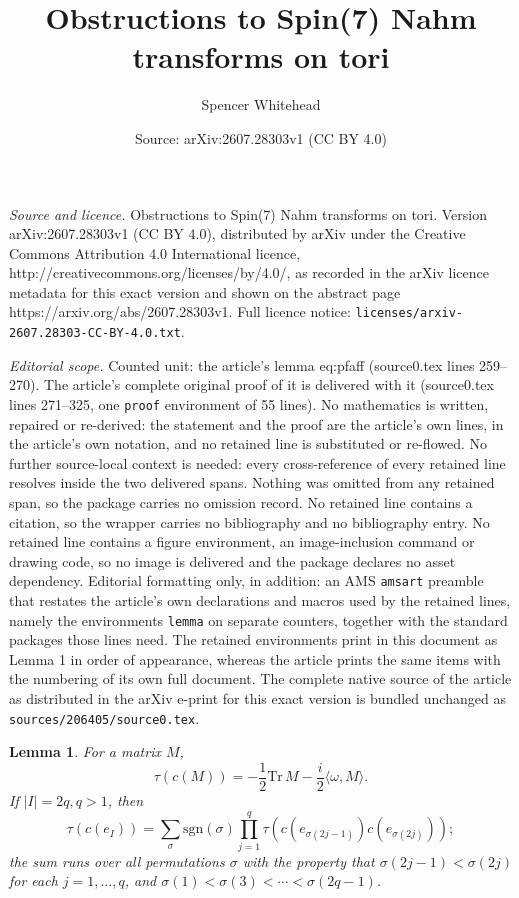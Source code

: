 \documentclass[10pt,a4paper]{amsart}
\title{Obstructions to Spin(7) Nahm transforms on tori}
\author{Spencer Whitehead}
\date{Source: arXiv:2607.28303v1 (CC BY 4.0)}
\newtheorem{lemma}{Lemma}
\begin{document}
\maketitle

\noindent\emph{Source and licence.} Obstructions to Spin(7) Nahm transforms on tori. Version arXiv:2607.28303v1 (CC BY 4.0), distributed by arXiv under the Creative Commons Attribution 4.0 International licence, http://creativecommons.org/licenses/by/4.0/, as recorded in the arXiv licence metadata for this exact version and shown on the abstract page https://arxiv.org/abs/2607.28303v1. Full licence notice: \texttt{licenses/arxiv-2607.28303-CC-BY-4.0.txt}.\par\smallskip

\noindent\textit{Editorial scope.} Counted unit: the article's lemma eq:pfaff (source0.tex lines 259--270). The article's complete original proof of it is delivered with it (source0.tex lines 271--325, one \texttt{proof} environment of 55 lines). No mathematics is written, repaired or re-derived: the statement and the proof are the article's own lines, in the article's own notation, and no retained line is substituted or re-flowed.  No further source-local context is needed: every cross-reference of every retained line resolves inside the two delivered spans.  Nothing was omitted from any retained span, so the package carries no omission record.  No retained line contains a citation, so the wrapper carries no bibliography and no bibliography entry.  No retained line contains a figure environment, an image-inclusion command or drawing code, so no image is delivered and the package declares no asset dependency.  Editorial formatting only, in addition: an AMS \texttt{amsart} preamble that restates the article's own declarations and macros used by the retained lines, namely the environments \texttt{lemma} on separate counters, together with the standard packages those lines need.  The retained environments print in this document as Lemma 1 in order of appearance, whereas the article prints the same items with the numbering of its own full document.  The complete native source of the article as distributed in the arXiv e-print for this exact version is bundled unchanged as \texttt{sources/206405/source0.tex}.
\begin{lemma}
    For a matrix $M$,
    \[
        \tau(c(M)) = -\frac{1}{2} \mathrm{Tr}\,M - \frac{i}{2} \langle \omega, M \rangle.
    \]
    If $|I| = 2q, q > 1$, then
    \begin{equation}
        \label{eq:pfaff}
        \tau(c(e_I)) = \sum_\sigma \mathrm{sgn}(\sigma) \prod_{j=1}^q \tau(c(e_{\sigma(2j-1)}) c(e_{\sigma(2j)}));
    \end{equation}
    the sum runs over all permutations $\sigma$ with the property that $\sigma(2j-1) < \sigma(2j)$ for each $j = 1, \ldots, q$, and $\sigma(1) < \sigma(3) < \cdots < \sigma(2q-1)$.
\end{lemma}
\end{document}
